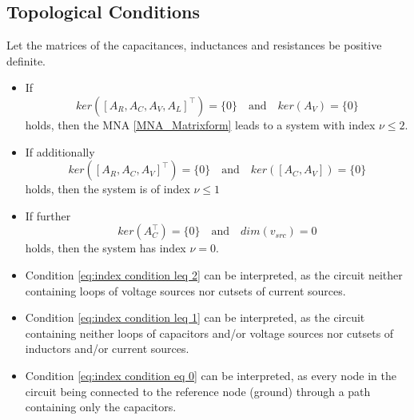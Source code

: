 	\subsection{Topological Conditions}
	\begin{frame}
		\begin{theorem}
			Let the matrices of the capacitances, inductances and resistances be positive definite.
			\begin{itemize}
				\item If
				\begin{equation}
					\label{eq:index condition leq 2}
					ker([A_R, A_C, A_V, A_L]^\top) = \{0\} \quad \text{and} \quad ker(A_V) = \{0\}
				\end{equation}
				holds, then the MNA \eqref{MNA_Matrixform} leads to a system with index $\nu \leq 2$.
				
				\item If additionally
				\begin{equation}
					\label{eq:index condition leq 1}
					ker([A_R, A_C, A_V]^\top) = \{0\} \quad \text{and} \quad ker([A_C, A_V]) = \{0\}
				\end{equation}
				holds, then the system is of index $\nu \leq 1$
				
				\item If further
				\begin{equation}
					\label{eq:index condition eq 0}
					ker(A_C^\top) = \{0\} \quad \text{and} \quad dim(v_{src}) = 0
				\end{equation}
				holds, then the system has index $\nu = 0$.
			\end{itemize}
		\end{theorem}
	\end{frame}
	\begin{frame}
		\begin{itemize}
			\item Condition \eqref{eq:index condition leq 2} can be interpreted, as the circuit neither containing loops of voltage sources nor cutsets of current sources.
			\item Condition \eqref{eq:index condition leq 1} can be interpreted, as the circuit containing neither loops of capacitors and/or voltage sources nor cutsets of inductors and/or current sources.
			\item Condition \eqref{eq:index condition eq 0} can be interpreted, as every node in the circuit being connected to the reference node (ground) through a path containing only the capacitors.
		\end{itemize}
	\end{frame}


